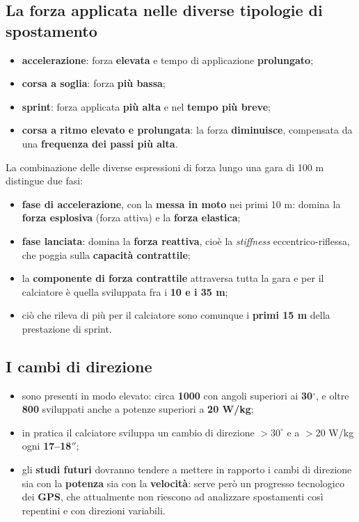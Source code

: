 \subsection{La forza applicata nelle diverse tipologie di spostamento}

\begin{itemize}
  \item \textbf{accelerazione}: forza \textbf{elevata} e tempo di applicazione \textbf{prolungato};
  \item \textbf{corsa a soglia}: forza \textbf{più bassa};
  \item \textbf{sprint}: forza applicata \textbf{più alta} e nel \textbf{tempo più breve};
  \item \textbf{corsa a ritmo elevato e prolungata}: la forza \textbf{diminuisce}, compensata da
    una \textbf{frequenza dei passi più alta}.
\end{itemize}

La combinazione delle diverse espressioni di forza lungo una gara di 100 m distingue due fasi:
\begin{itemize}
  \item \textbf{fase di accelerazione}, con la \textbf{messa in moto} nei primi 10 m: domina la
    \textbf{forza esplosiva} (forza attiva) e la \textbf{forza elastica};
  \item \textbf{fase lanciata}: domina la \textbf{forza reattiva}, cioè la \textit{stiffness}
    eccentrico-riflessa, che poggia sulla \textbf{capacità contrattile};
  \item la \textbf{componente di forza contrattile} attraversa tutta la gara e per il calciatore è
    quella sviluppata fra i \textbf{10 e i 35 m};
  \item ciò che rileva di più per il calciatore sono comunque i \textbf{primi 15 m} della
    prestazione di sprint.
\end{itemize}

\subsection{I cambi di direzione}

\begin{itemize}
  \item sono presenti in modo elevato: circa \textbf{1000} con angoli superiori ai
    \textbf{30$^\circ$}, e oltre \textbf{800} sviluppati anche a potenze superiori a
    \textbf{20 W/kg};
  \item in pratica il calciatore sviluppa un cambio di direzione $> 30^\circ$ e a $> 20$ W/kg ogni
    \textbf{17--18$''$};
  \item gli \textbf{studi futuri} dovranno tendere a mettere in rapporto i cambi di direzione sia
    con la \textbf{potenza} sia con la \textbf{velocità}: serve però un progresso tecnologico dei
    \textbf{GPS}, che attualmente non riescono ad analizzare spostamenti così repentini e con
    direzioni variabili.
\end{itemize}

